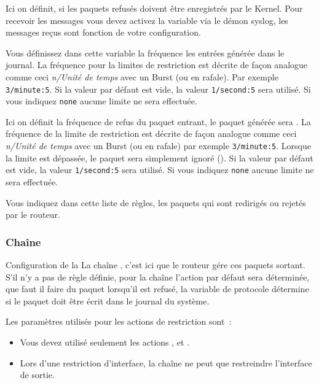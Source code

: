 \begin{description}
Ici on définit, si les paquets refusés doivent être enregistrés par le Kernel.
Pour recevoir les messages vous devez activez la variable 
via le démon syslog, les messages reçus sont fonction de votre configuration.

Vous définissez dans cette variable la fréquence les entrées générée dans le
journal. La fréquence pour la limites de restriction est décrite de façon
analogue comme ceci \emph{n/Unité de temps} avec un Burst (ou en rafale).
Par exemple \texttt{3/minute:5}. Si la valeur par défaut est vide, la valeur
\texttt{1/second:5} sera utilisé. Si vous indiquez \texttt{none} aucune limite
ne sera effectuée.

Ici on définit la fréquence de refus du paquet entrant, le paquet générée sera
. La fréquence de la limite de restriction est décrite de
façon analogue comme ceci \emph{n/Unité de temps} avec un Burst (ou en rafale)
par exemple \texttt{3/minute:5}. Lorsque la limite est dépassée, le paquet sera
simplement ignoré (). Si la valeur par défaut est vide, la valeur
\texttt{1/second:5} sera utilisé. Si vous indiquez \texttt{none} aucune limite
ne sera effectuée.

Vous indiquez dans cette liste de règles, les paquets qui sont redirigés
ou rejetés par le routeur.
\end{description}

\subsubsection{Chaîne }

Configuration de la La chaîne , c'est ici que le routeur gére
ces paquets sortant. S'il n'y a pas de règle définie, pour la chaîne
 l'action par défaut sera déterminée, que faut il faire du
paquet lorsqu'il est refusé, la variable de protocole détermine si le paquet
doit être écrit dans le journal du système.

Les paramètres utilisés pour les actions de restriction sont~:
\begin{itemize}
  \item Vous devez utilisé seulement les actions , 
    et .
  \item Lors d'une restriction d'interface, la chaîne ne peut que restreindre
  l'interface de sortie.
\end{itemize}

